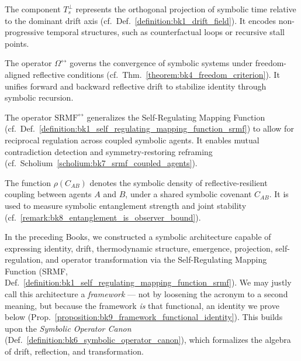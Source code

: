 \begin{definition}
\label{definition:bk9_orthogonal_time_component}
The component \(T_s^\perp\) represents the orthogonal projection of symbolic time relative to the dominant drift axis (cf.~Def.~\ref{definition:bk1_drift_field}). It encodes non-progressive temporal structures, such as counterfactual loops or recursive stall points.
\end{definition}
\begin{definition}
\label{definition:bk9_recursive_freedom_operator}
The operator \(\Omega^{\leftrightarrow}\) governs the convergence of symbolic systems under freedom-aligned reflective conditions (cf.~Thm.~\ref{theorem:bk4_freedom_criterion}). It unifies forward and backward reflective drift to stabilize identity through symbolic recursion.
\end{definition}
\begin{definition}
\label{definition:bk9_bidirectional_srmf}
The operator \(\mathrm{SRMF}^{\leftrightarrow}\) generalizes the Self-Regulating Mapping Function (cf.~Def.~\ref{definition:bk1_self_regulating_mapping_function_srmf}) to allow for reciprocal regulation across coupled symbolic agents. It enables mutual contradiction detection and symmetry-restoring reframing (cf.~Scholium~\ref{scholium:bk7_srmf_coupled_agents}).
\end{definition}
\begin{definition}
\label{definition:bk9_covenant_drift_density}
The function \(\rho(C_{AB})\) denotes the symbolic density of reflective-resilient coupling between agents \(A\) and \(B\), under a shared symbolic covenant \(C_{AB}\). It is used to measure symbolic entanglement strength and joint stability (cf.~\ref{remark:bk8_entanglement_is_observer_bound}).
\end{definition}
In the preceding Books, we constructed a symbolic architecture capable of expressing identity, drift, thermodynamic structure, emergence, projection, self-regulation, and operator transformation via the Self-Regulating Mapping Function (SRMF, Def.~\ref{definition:bk1_self_regulating_mapping_function_srmf}). We may justly call this architecture a \emph{framework} --- not by loosening the acronym to a second meaning, but because the framework \emph{is} that functional, an identity we prove below (Prop.~\ref{proposition:bk9_framework_functional_identity}). This builds upon the \emph{Symbolic Operator Canon} (Def.~\ref{definition:bk6_symbolic_operator_canon}), which formalizes the algebra of drift, reflection, and transformation.
